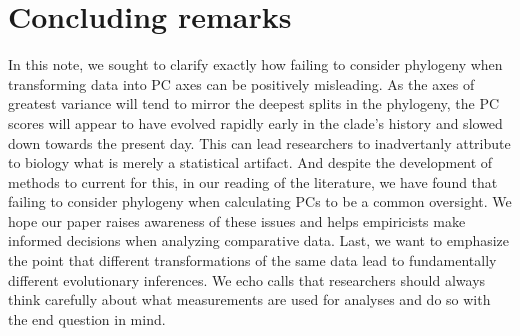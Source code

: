 \documentclass[a4paper,12pt]{article}
\begin{document}
\section{Concluding remarks}
In this note, we sought to clarify exactly how failing to consider phylogeny when transforming data into PC axes can be positively misleading. As the axes of greatest variance will tend to mirror the deepest splits in the phylogeny, the PC scores will appear to have evolved rapidly early in the clade's history and slowed down towards the present day. This can lead researchers to inadvertanly attribute to biology what is merely a statistical artifact. And despite the development of methods to current for this, in our reading of the literature, we have found that failing to consider phylogeny when calculating PCs to be a common oversight. We hope our paper raises awareness of these issues and helps empiricists make informed decisions when analyzing comparative data. Last, we want to emphasize the point that different transformations of the same data lead to fundamentally different evolutionary inferences. We echo calls \citep{HansenHoule2008, Houle2011} that researchers should always think carefully about what measurements are used for analyses and do so with the end question in mind.

\newpage



\end{document}
